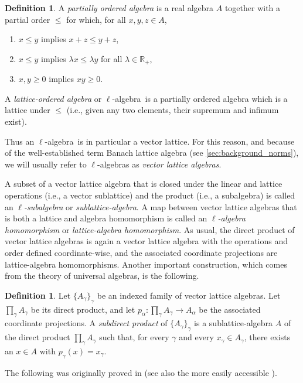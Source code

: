 \documentclass{memo-l}
\theoremstyle{definition}
\newtheorem{defn}[theorem]{Definition}
\theoremstyle{remark}
\numberwithin{section}{chapter}
\numberwithin{equation}{chapter}
\newcommand\R{\ensuremath{\mathbb{R}}}
\newcommand{\lalg}{$\ell$-algebra}
\begin{document}
\begin{defn}
    A \emph{partially ordered algebra} is a real algebra $A$ together with a
    partial order $\le $ for which, for all $x,y,z \in A$,
    \begin{enumerate}
        \item $x\le y$ implies $x+z \le y+z$,
        \item $x\le y$ implies $\lambda x\le \lambda y$ for all
            $\lambda \in \R_+$,
        \item $x,y\ge 0$ implies $xy \ge 0$.
    \end{enumerate}
    A \emph{lattice-ordered algebra} or \lalg\ is a partially ordered
    algebra which is a lattice under $\le $ (i.e., given any two
    elements, their supremum and infimum exist).
\end{defn}

Thus an \lalg\ is in particular a vector lattice. For this reason, and
because of the well-established term Banach lattice algebra (see
\cref{sec:background_norms}), we will usually refer to \lalg s as \emph{vector lattice
algebras}.

A subset of a vector lattice algebra that is closed under the linear
and lattice operations (i.e., a vector sublattice) and the product
(i.e., a subalgebra) is called an \emph{$\ell$-subalgebra} or
\emph{sublattice-algebra}. A map between vector lattice algebras that
is both a lattice and algebra homomorphism is called an
\emph{$\ell$-algebra homomorphism} or
\emph{lattice-algebra homomorphism}. As usual, the direct product of vector
lattice algebras is again a vector lattice algebra with the
operations and order defined coordinate-wise, and the associated coordinate
projections are lattice-algebra homomorphisms. Another important
construction, which comes from the theory of universal algebras, is
the following.

\begin{defn}
    Let $\{A_\gamma\}_\gamma $ be an indexed family of vector lattice
    algebras. Let $\prod_\gamma A_\gamma $ be its direct product,
    and let $p_\alpha \colon \prod_\gamma A_\gamma \to A_\alpha$ be the
    associated coordinate projections. A \emph{subdirect product} of
    $\{A_\gamma \}_\gamma $ is a sublattice-algebra $A$ of the direct
    product $\prod_\gamma A_\gamma $ such that, for every $\gamma $ and
    every $x_\gamma  \in A_\gamma $, there exists an $x \in A$ with
    $p_\gamma (x)=x_\gamma $.
\end{defn}

The following was originally proved in \cite{birkhoff_pierce1956} (see
also the more easily accessible \cite[Section VII.5]{birkhoff1967}).
\end{document}
